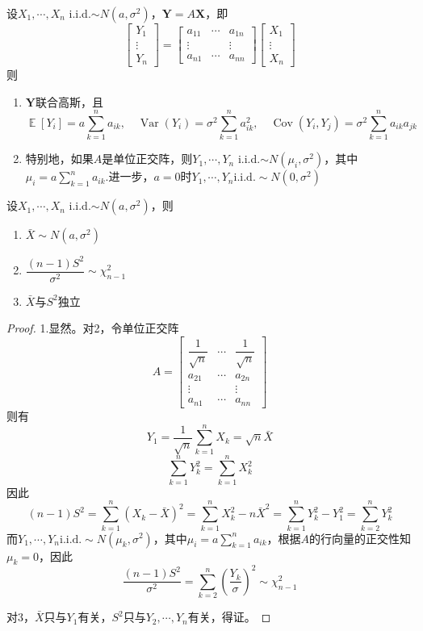 \documentclass{ctexbook}
\DeclareMathOperator{\Var}{Var}          %
\DeclareMathOperator{\Cov}{Cov}          %
\DeclareMathOperator{\E}{\mathbb{E}}     %
\newcommand{\iid}{\text{i.i.d.}}          %
\begin{document}
\begin{theorem}
    设$X_1,\cdots,X_n$ i.i.d.$\sim N(a,\sigma^2)$，$\mathbf{Y}=A\mathbf{X}$，即
    $$\begin{bmatrix}
        Y_1\\
        \vdots\\
        Y_n
    \end{bmatrix}=\begin{bmatrix}
        a_{11} & \cdots & a_{1n}\\
        \vdots & & \vdots \\
        a_{n1} & \cdots & a_{nn}
    \end{bmatrix}\begin{bmatrix}
        X_1\\
        \vdots\\
        X_n
    \end{bmatrix}$$
    则\begin{enumerate}
        \item $\mathbf{Y}$联合高斯，且
        $$\E[Y_i]=a\sum_{k=1}^n a_{ik},\quad \Var(Y_i)=\sigma^2\sum_{k=1}^n a_{ik}^2,\quad \Cov(Y_i,Y_j)=\sigma^2\sum_{k=1}^n a_{ik}a_{jk}$$
        \item 特别地，如果$A$是单位正交阵，则$Y_1,\cdots,Y_n$ i.i.d.$\sim N(\mu_i,\sigma^2)$，其中$\mu_i=a\sum_{k=1}^n a_{ik}$.进一步，$a=0$时$Y_1,\cdots,Y_n\iid \sim N(0,\sigma^2)$
    \end{enumerate}
\end{theorem}

\begin{theorem}
    设$X_1,\cdots,X_n$ i.i.d.$\sim N(a,\sigma^2)$，则\begin{enumerate}
        \item $\bar{X}\sim N(a,\sigma^2)$
        \item $\dfrac{(n-1)S^2}{\sigma^2}\sim \chi_{n-1}^2$
        \item $\bar{X}$与$S^2$独立
    \end{enumerate}
\end{theorem}
\begin{proof}
    1.显然。对2，令单位正交阵
    $$A=\begin{bmatrix}
        \dfrac{1}{\sqrt{n}} & \cdots & \dfrac{1}{\sqrt{n}}\\
        a_{21} & \cdots & a_{2n}\\
        \vdots & & \vdots\\
        a_{n1} & \cdots & a_{nn}
    \end{bmatrix}$$
    则有$$Y_1=\frac{1}{\sqrt{n}}\sum_{k=1}^n X_k=\sqrt{n}\bar{X}$$
    $$\sum_{k=1}^n Y_k^2=\sum_{k=1}^n X_k^2$$
    因此
    $$(n-1)S^2=\sum_{k=1}^n (X_k-\bar{X})^2=\sum_{k=1}^n X_k^2-n\bar{X}^2=\sum_{k=1}^n Y_k^2-Y_1^2=\sum_{k=2}^n Y_k^2$$
    而$Y_1,\cdots,Y_n\iid\sim N(\mu_k,\sigma^2)$，其中$\mu_i=a\sum_{k=1}^n a_{ik}$，根据$A$的行向量的正交性知$\mu_k=0$，因此
    $$\frac{(n-1)S^2}{\sigma^2}=\sum_{k=2}^n \left(\frac{Y_k}{\sigma}\right)^2\sim \chi_{n-1}^2$$

    对3，$\bar{X}$只与$Y_1$有关，$S^2$只与$Y_2,\cdots,Y_n$有关，得证。
\end{proof}
\end{document}
